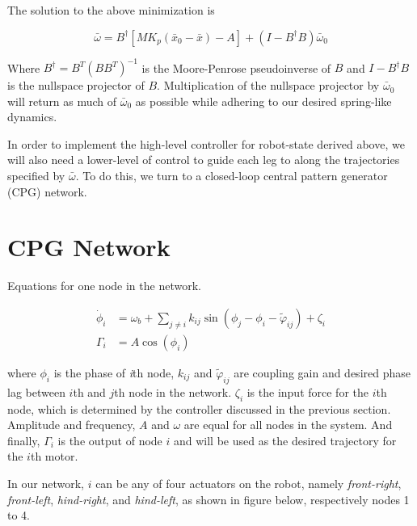 \documentclass{article}
\begin{document}
The solution to the above minimization is

\begin{equation}
	\bar{\omega} = B^\dagger [M K_p (\bar{x}_0 - \bar{x}) - A] + (I - B^\dagger B) \bar{\omega}_0
	\label{eq:controller}
\end{equation}

Where $B^\dagger = B^T (B B^T)^{-1}$ is the Moore-Penrose pseudoinverse of $B$ and $I - B^\dagger B$ is the nullspace projector of $B$. Multiplication of the nullspace projector by $\bar{\omega}_0$ will return as much of $\bar{\omega}_0$ as possible while adhering to our desired spring-like dynamics.

In order to implement the high-level controller for robot-state derived above, we will also need a lower-level of control to guide each leg to along the trajectories specified by $\bar{\omega}$. To do this, we turn to a closed-loop central pattern generator (CPG) network.

\section*{CPG Network}

Equations for one node in the network.

\begin{align}\label{eq:one_node}
	\dot \phi_i &= \omega_{b} + \sum_{j \neq i} k_{ij} \sin \left( \phi_j - \phi_i - \tilde{\varphi}_{ij} \right ) + \zeta_i\\
	\Gamma_i    &= A \cos(\phi_i)
\end{align}

where $\phi_i$ is the phase of \textit{i}th node, $k_{ij}$ and $\tilde{\varphi}_{ij}$ are coupling gain and desired phase lag between $i$th and $j$th node in the network. $\zeta_i$ is the input force for the $i$th node, which is determined by the controller discussed in the previous section. Amplitude and frequency, $A$ and $\omega$ are equal for all nodes in the system. And finally, $\Gamma_i$ is the output of node $i$ and will be used as the desired trajectory for the $i$th motor.

In our network, $i$ can be any of four actuators on the robot, namely \textit{front-right}, \textit{front-left}, \textit{hind-right}, and  \textit{hind-left}, as shown in figure below, respectively nodes 1 to 4.
\end{document}
